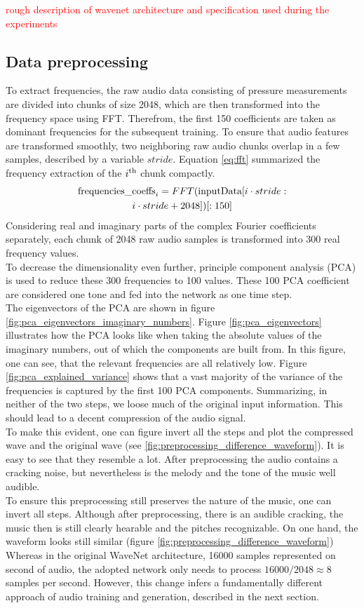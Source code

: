 \documentclass[10pt,conference,compsocconf]{IEEEtran}
\begin{document}
\textcolor{red}{rough description of wavenet architecture and specification used during the experiments}
\subsection{Data preprocessing}
To extract frequencies, the raw audio data consisting of pressure measurements are divided into chunks of size 2048, which are then transformed into the frequency space using FFT. Therefrom, the first 150 coefficients are taken as dominant frequencies for the subsequent training. To ensure that audio features are transformed smoothly, two neighboring raw audio chunks overlap in a few samples, described by a variable $stride$. Equation \ref{eq:fft} summarized the frequency extraction of the $i^\textnormal{th}$ chunk compactly.
\begin{multline}\label{eq:fft}
\textnormal{frequencies\_coeffs}_i =
FFT(\textnormal{inputData}[i \cdot stride:\\i \cdot stride+2048])[:150]
\end{multline}
Considering real and imaginary parts of the complex Fourier coefficients separately, each chunk of 2048 raw audio samples is transformed into 300 real frequency values.\\
To decrease the dimensionality even further, principle component analysis (PCA) is used to reduce these 300 frequencies to 100 values.
These 100 PCA coefficient are considered one tone and fed into the network as one time step.\\
The eigenvectors of the PCA are shown in figure \ref{fig:pca_eigenvectors_imaginary_numbers}. Figure \ref{fig:pca_eigenvectors} illustrates how the PCA looks like when taking the absolute values of the imaginary numbers, out of which the components are built from. In this figure, one can see, that the relevant frequencies are all relatively low. Figure \ref{fig:pca_explained_variance} shows that a vast majority of the variance of the frequencies is captured by the first 100 PCA components. Summarizing, in neither of the two steps, we loose much of the original input information. This should lead to a decent compression of the audio signal.\\
To make this evident, one can figure invert all the steps and plot the compressed wave and the original wave (see \ref{fig:preprocessing_difference_waveform}). It is easy to see that they resemble a lot. After preprocessing the audio contains a cracking noise, but nevertheless is the melody and the tone of the music well audible.\\
To ensure this preprocessing still preserves the nature of the music, one can invert all steps. Although after preprocessing, there is an audible cracking, the music then is still clearly hearable and the pitches recognizable.
On one hand, the waveform looks still similar (figure \ref{fig:preprocessing_difference_waveform})
Whereas in the original WaveNet architecture, 16000 samples represented on second of audio, the adopted network only needs to process $16000/2048 \approx 8$ samples per second. However, this change infers a fundamentally different approach of audio training and generation, described in the next section. 
\end{document}
